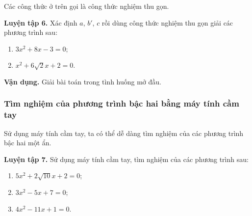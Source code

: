 \begin{lesson}
    Các công thức ở trên gọi là công thức nghiệm thu gọn.

    \textbf{Luyện tập 6.} Xác định $a$, $b'$, $c$ rồi dùng công thức nghiệm thu gọn giải các phương trình sau:
    \begin{enumerate}[label=\alph*)]
        \item $3x^2+8x-3=0$;
        \item $x^2+6\sqrt{2}x+2=0$.
    \end{enumerate}

    \answerline
    \answerline

    \textbf{Vận dụng.} Giải bài toán trong tình huống mở đầu.

    \answerline
    \answerline
    \answerline

    \subsubsection{Tìm nghiệm của phương trình bậc hai bằng máy tính cầm tay}

    Sử dụng máy tính cầm tay, ta có thể dễ dàng tìm nghiệm của các phương trình bậc hai một ẩn.

    \textbf{Luyện tập 7.} Sử dụng máy tính cầm tay, tìm nghiệm của các phương trình sau:
    \begin{enumerate}[label=\alph*)]
        \item $5x^2+2\sqrt{10}x+2=0$;
        \item $3x^2-5x+7=0$;
        \item $4x^2-11x+1=0$.
    \end{enumerate}

    \answerline
    \answerline
\end{lesson}

